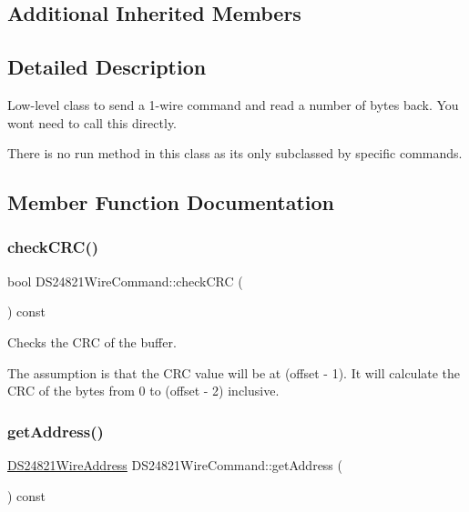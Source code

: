 \subsection*{Additional Inherited Members}


\subsection{Detailed Description}
Low-\/level class to send a 1-\/wire command and read a number of bytes back. You won\textquotesingle{}t need to call this directly. 

There is no run method in this class as it\textquotesingle{}s only subclassed by specific commands. 

\subsection{Member Function Documentation}
\mbox{\label{class_d_s24821_wire_command_a721ceae3f65419340b0ea0efa75a37a6}} 
\subsubsection{\texorpdfstring{check\+C\+R\+C()}{checkCRC()}}
{\footnotesize\ttfamily bool D\+S24821\+Wire\+Command\+::check\+C\+RC (\begin{DoxyParamCaption}{ }\end{DoxyParamCaption}) const}



Checks the C\+RC of the buffer. 

The assumption is that the C\+RC value will be at (offset -\/ 1). It will calculate the C\+RC of the bytes from 0 to (offset -\/ 2) inclusive. \mbox{\label{class_d_s24821_wire_command_ab00d3a0b120d3cc33675165d1174aa16}} 
\subsubsection{\texorpdfstring{get\+Address()}{getAddress()}}
{\footnotesize\ttfamily \mbox{\hyperlink{class_d_s24821_wire_address}{D\+S24821\+Wire\+Address}} D\+S24821\+Wire\+Command\+::get\+Address (\begin{DoxyParamCaption}{ }\end{DoxyParamCaption}) const}



